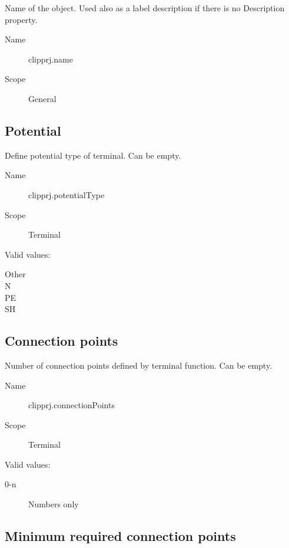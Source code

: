 \documentclass[%
	a4paper,
	oneside,
	listof=numbered,
	parskip=half,
	headsepline=true,
	footsepline=false,
	normalheadings,
	0.7headlines,
	headexclude,
	]{scrbook}
\begin{document}
Name of the object.
Used also as a label description if there is no Description property.

\begin{description}
	\item[Name] clipprj.name
	\item[Scope] General
\end{description}

\subsection{Potential}

Define potential type of terminal.
Can be empty.

\begin{description}
	\item[Name] clipprj.potentialType
	\item[Scope] Terminal
\end{description}

Valid values:

\begin{description}
	\item[Other]
	\item[N]
	\item[PE]
	\item[SH]
\end{description}

\subsection{Connection points}

Number of connection points defined by terminal function.
Can be empty.

\begin{description}
	\item[Name] clipprj.connectionPoints
	\item[Scope] Terminal
\end{description}

Valid values:

\begin{description}
	\item[0-n] Numbers only
\end{description}

\subsection{Minimum required connection points}
\end{document}
